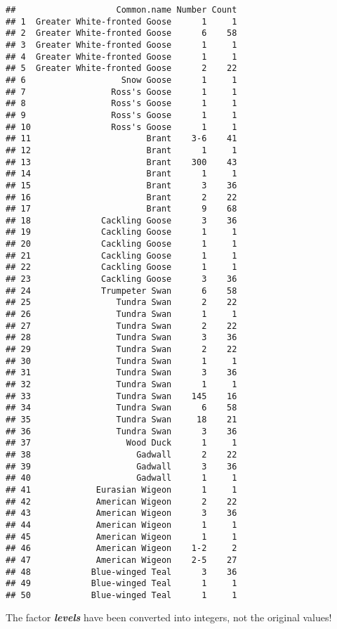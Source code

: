\documentclass[]{book}
\begin{document}
\begin{verbatim}
##                    Common.name Number Count
## 1  Greater White-fronted Goose      1     1
## 2  Greater White-fronted Goose      6    58
## 3  Greater White-fronted Goose      1     1
## 4  Greater White-fronted Goose      1     1
## 5  Greater White-fronted Goose      2    22
## 6                   Snow Goose      1     1
## 7                 Ross's Goose      1     1
## 8                 Ross's Goose      1     1
## 9                 Ross's Goose      1     1
## 10                Ross's Goose      1     1
## 11                       Brant    3-6    41
## 12                       Brant      1     1
## 13                       Brant    300    43
## 14                       Brant      1     1
## 15                       Brant      3    36
## 16                       Brant      2    22
## 17                       Brant      9    68
## 18              Cackling Goose      3    36
## 19              Cackling Goose      1     1
## 20              Cackling Goose      1     1
## 21              Cackling Goose      1     1
## 22              Cackling Goose      1     1
## 23              Cackling Goose      3    36
## 24              Trumpeter Swan      6    58
## 25                 Tundra Swan      2    22
## 26                 Tundra Swan      1     1
## 27                 Tundra Swan      2    22
## 28                 Tundra Swan      3    36
## 29                 Tundra Swan      2    22
## 30                 Tundra Swan      1     1
## 31                 Tundra Swan      3    36
## 32                 Tundra Swan      1     1
## 33                 Tundra Swan    145    16
## 34                 Tundra Swan      6    58
## 35                 Tundra Swan     18    21
## 36                 Tundra Swan      3    36
## 37                   Wood Duck      1     1
## 38                     Gadwall      2    22
## 39                     Gadwall      3    36
## 40                     Gadwall      1     1
## 41             Eurasian Wigeon      1     1
## 42             American Wigeon      2    22
## 43             American Wigeon      3    36
## 44             American Wigeon      1     1
## 45             American Wigeon      1     1
## 46             American Wigeon    1-2     2
## 47             American Wigeon    2-5    27
## 48            Blue-winged Teal      3    36
## 49            Blue-winged Teal      1     1
## 50            Blue-winged Teal      1     1
\end{verbatim}

The factor \textbf{\emph{levels}} have been converted into integers, not the original values!
\end{document}

